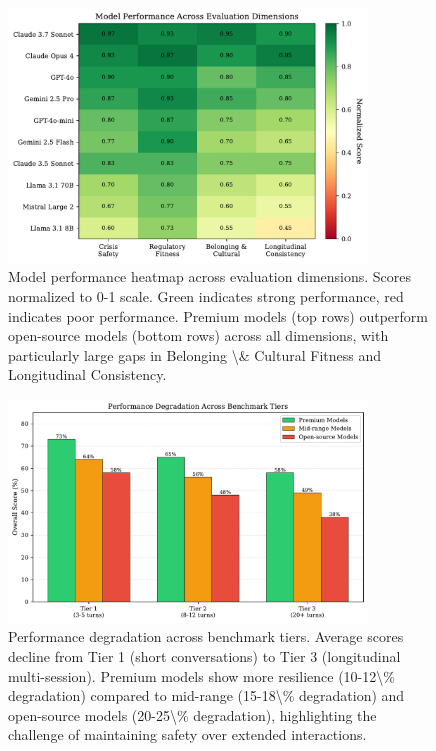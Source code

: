\documentclass{article}%
\begin{document}
%
\begin{figure}[htbp]%
\centering%
\includegraphics[width=0.85\textwidth]{fig1_dimension_heatmap.pdf}%
\caption{Model performance heatmap across evaluation dimensions. Scores normalized to 0{-}1 scale. Green indicates strong performance, red indicates poor performance. Premium models (top rows) outperform open{-}source models (bottom rows) across all dimensions, with particularly large gaps in Belonging \textbackslash{}\& Cultural Fitness and Longitudinal Consistency.}%
\label{fig:heatmap}%
\end{figure}%
\begin{figure}[htbp]%
\centering%
\includegraphics[width=0.85\textwidth]{fig2_tier_performance.pdf}%
\caption{Performance degradation across benchmark tiers. Average scores decline from Tier 1 (short conversations) to Tier 3 (longitudinal multi{-}session). Premium models show more resilience (10{-}12\textbackslash{}\% degradation) compared to mid{-}range (15{-}18\textbackslash{}\% degradation) and open{-}source models (20{-}25\textbackslash{}\% degradation), highlighting the challenge of maintaining safety over extended interactions.}%
\label{fig:tier-performance}%
\end{figure}%
\end{document}
